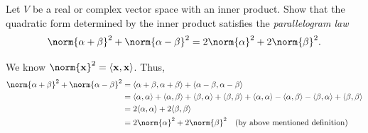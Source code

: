 \documentclass[11pt]{article}
\begin{document}
\begin{homeworkProblem}

    Let $V$ be a real or complex vector space with an inner product. Show that the quadratic form
    determined by the inner product satisfies the \textit{parallelogram law}
    \[
        \norm{\alpha + \beta}^2 + \norm{\alpha - \beta}^2 = 2\norm{\alpha}^2 + 2\norm{\beta}^2.
    \]
    \solution

    We know \(\norm{\mathbf{x}}^2 = \langle \mathbf{x}, \mathbf{x} \rangle\). Thus,
    \begin{align*}
        \norm{\alpha + \beta}^2 + \norm{\alpha - \beta}^2 & = \langle \alpha + \beta, \alpha + \beta \rangle + \langle \alpha - \beta, \alpha - \beta \rangle                                                                                                                                                               \\
                                                          & = \langle \alpha, \alpha \rangle + \langle \alpha, \beta \rangle + \langle \beta, \alpha \rangle + \langle \beta, \beta \rangle + \langle \alpha, \alpha \rangle - \langle \alpha, \beta \rangle - \langle \beta, \alpha \rangle + \langle \beta, \beta \rangle \\
                                                          & = 2\langle \alpha, \alpha \rangle + 2\langle \beta, \beta \rangle                                                                                                                                                                                               \\
                                                          & = 2\norm{\alpha}^2 + 2\norm{\beta}^2 \quad \text{(by above mentioned definition)}
    \end{align*}

\end{homeworkProblem}

\pagebreak
\end{document}
